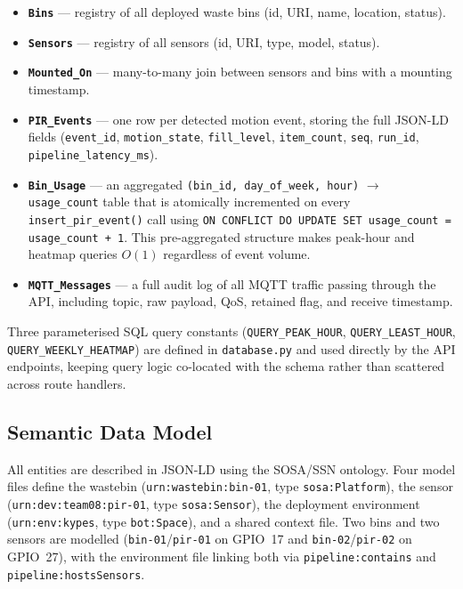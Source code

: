 \documentclass[10pt,a4paper]{article}
\begin{document}
\begin{itemize}
\item \textbf{\texttt{Bins}} --- registry of all deployed waste bins (id, URI, name, location, status).
\item \textbf{\texttt{Sensors}} --- registry of all sensors (id, URI, type, model, status).
\item \textbf{\texttt{Mounted\_On}} --- many-to-many join between sensors and bins with a mounting timestamp.
\item \textbf{\texttt{PIR\_Events}} --- one row per detected motion event, storing the full JSON-LD fields (\texttt{event\_id}, \texttt{motion\_state}, \texttt{fill\_level}, \texttt{item\_count}, \texttt{seq}, \texttt{run\_id}, \texttt{pipeline\_latency\_ms}).
\item \textbf{\texttt{Bin\_Usage}} --- an aggregated \texttt{(bin\_id, day\_of\_week, hour)} $\to$ \texttt{usage\_count} table that is atomically incremented on every \texttt{insert\_pir\_event()} call using \texttt{ON CONFLICT DO UPDATE SET usage\_count = usage\_count + 1}. This pre-aggregated structure makes peak-hour and heatmap queries $O(1)$ regardless of event volume.
\item \textbf{\texttt{MQTT\_Messages}} --- a full audit log of all MQTT traffic passing through the API, including topic, raw payload, QoS, retained flag, and receive timestamp.
\end{itemize}

Three parameterised SQL query constants (\texttt{QUERY\_PEAK\_HOUR}, \texttt{QUERY\_LEAST\_HOUR}, \texttt{QUERY\_WEEKLY\_HEATMAP}) are defined in \texttt{database.py} and used directly by the API endpoints, keeping query logic co-located with the schema rather than scattered across route handlers.

\subsection{Semantic Data Model}

All entities are described in JSON-LD using the SOSA/SSN ontology. Four model files
define the wastebin (\texttt{urn:wastebin:bin-01}, type \texttt{sosa:Platform}),
the sensor (\texttt{urn:dev:team08:pir-01}, type \texttt{sosa:Sensor}), the deployment
environment (\texttt{urn:env:kypes}, type \texttt{bot:Space}), and a shared context
file. Two bins and two sensors are modelled (\texttt{bin-01}/\texttt{pir-01} on GPIO~17 and \texttt{bin-02}/\texttt{pir-02} on GPIO~27), with the environment file linking both via \texttt{pipeline:contains} and \texttt{pipeline:hostsSensors}.
\end{document}
